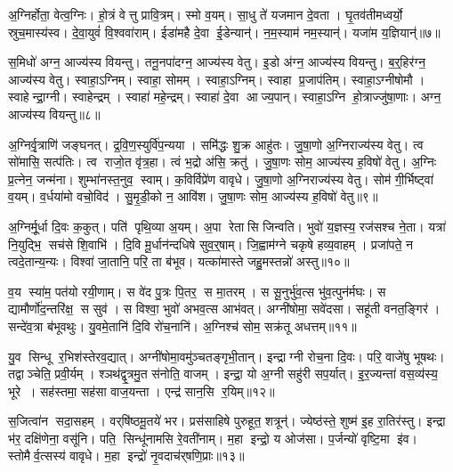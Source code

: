 अ॒ग्निर्\mbox{}होता॒ वेत्व॒ग्निः। हो॒त्रं वेत्तु प्रावि॒त्रम्। स्मो व॒यम्। सा॒धु ते॑ यजमान दे॒वता। घृ॒तव॑तीमध्वर्यो॒ स्रुच॒मास्य॑स्व। दे॒वा॒युवं॑ वि॒श्ववा॑राम्। ईडा॑महै दे॒वा ई॒डेन्यान्॑। न॒म॒स्याम॑ नम॒स्यान्॑। यजा॑म य॒ज्ञियान्॑॥७॥\anuvakamend[अ॒ग्निर्‌होता॒ नव॑]

स॒मिधो॑ अग्न॒ आज्य॑स्य वियन्तु। तनू॒नपा॑दग्न॒ आज्य॑स्य वेतु। इ॒डो अ॑ग्न॒ आज्य॑स्य वियन्तु। ब॒र्॒हिर॑ग्न॒ आज्य॑स्य वेतु। स्वाहा॒ऽग्निम्। स्वाहा॒ सोमम्। स्वाहा॒ऽग्निम्। स्वाहा प्र॒जाप॑तिम्। स्वाहा॒ऽग्नीषोमौ। स्वाहेन्द्रा॒ग्नी। स्वाहेन्द्रम्। स्वाहा॑ महे॒न्द्रम्। स्वाहा॑ दे॒वा आज्य॒पान्। स्वाहा॒ऽग्नि हो॒त्राज्जु॑षा॒णाः। अग्न॒ आज्य॑स्य वियन्तु॥८॥\anuvakamend[इ॒न्द्रा॒ग्नी पञ्च॑ च]

अ॒ग्निर्वृ॒त्राणि॑ जङ्घनत्। द्र॒वि॒ण॒स्युर्वि॑प॒न्यया। समि॑द्धः शु॒क्र आहु॑तः। जु॒षा॒णो अ॒ग्निराज्य॑स्य वेतु। त्व सो॑मासि॒ सत्प॑तिः। त्व राजो॒त वृ॑त्र॒हा। त्वं भ॒द्रो अ॑सि॒ क्रतु॑। जु॒षा॒णः सोम॒ आज्य॑स्य ह॒विषो॑ वेतु। अ॒ग्निः प्र॒त्नेन॒ जन्म॑ना। शुम्भा॑नस्त॒नुव॒ स्वाम्। क॒विर्विप्रे॑ण वावृधे। जु॒षा॒णो अ॒ग्निराज्य॑स्य वेतु। सोम॑ गी॒र्भिष्ट्वा॑ व॒यम्। व॒र्धया॑मो वचो॒विद॑। सु॒मृ॒डी॒को न॒ आवि॑श। जु॒षा॒णः सोम॒ आज्य॑स्य ह॒विषो॑ वेतु॥९॥\anuvakamend[स्वा षट् च॑]

अ॒ग्निर्मू॒र्धा दि॒वः क॒कुत्। पति॑ पृथि॒व्या अ॒यम्। अ॒पा रेतासि जिन्वति। भुवो॑ य॒ज्ञस्य॒ रज॑सश्च ने॒ता। यत्रा॑ नि॒युद्भि॒ सच॑से शि॒वाभि॑। दि॒वि मू॒र्धान॑न्दधिषे सुव॒र्॒षाम्। जि॒ह्वाम॑ग्ने चकृषे हव्य॒वाहम्। प्रजा॑पते॒ न त्वदे॒तान्य॒न्यः। विश्वा॑ जा॒तानि॒ परि॒ ता ब॑भूव। यत्का॑मास्ते जहु॒मस्तन्नो॑ अस्तु॥१०॥

व॒य स्या॑म॒ पत॑यो रयी॒णाम्। स वे॑द पु॒त्रः पि॒तर॒ स मा॒तरम्। स सू॒नुर्भु॑व॒त्स भु॑व॒त्पुन॑र्मघः। स द्यामौर्णो॑द॒न्तरि॑क्ष॒ स सुव॑। स विश्वा॒ भुवो॑ अभव॒त्स आभ॑वत्। अग्नी॑षोमा॒ सवे॑दसा। सहू॑ती वनत॒ङ्गिर॑। सन्दे॑व॒त्रा ब॑भूवथुः। यु॒वमे॒तानि॑ दि॒वि रो॑च॒नानि॑। अ॒ग्निश्च॑ सोम॒ सक्र॑तू अधत्तम्॥११॥

यु॒व सिन्धू र॒भिश॑स्तेरव॒द्यात्। अग्नी॑षोमा॒वमु॑ञ्चतङ्गृभी॒तान्। इन्द्राग्नी रोच॒ना दि॒वः। परि॒ वाजे॑षु भूषथः। तद्वाञ्चेति॒ प्रवी॒र्यम्। श्ञथ॑द्वृ॒त्रमु॒त स॑नोति॒ वाजम्। इन्द्रा॒ यो अ॒ग्नी सहु॑री सप॒र्यात्। इ॒र॒ज्यन्ता॑ वस॒व्य॑स्य॒ भूरे। सह॑स्तमा॒ सह॑सा वाज॒यन्ता। एन्द्र॑ सान॒सि र॒यिम्॥१२॥

स॒जित्वा॑न सदा॒सहम्। वर्‌षि॑ष्ठमू॒तये॑ भर। प्रस॑साहिषे पुरुहूत॒ शत्रून्॑। ज्येष्ठ॑स्ते॒ शुष्म॑ इ॒ह रा॒तिर॑स्तु। इन्द्रा भ॑र॒ दक्षि॑णेना॒ वसू॑नि। पति॒ सिन्धू॑नामसि रे॒वती॑नाम्। म॒हा इन्द्रो॒ य ओज॑सा। प॒र्जन्यो॑ वृष्टि॒मा इ॑व। स्तोमैर्व॒त्सस्य॑ वावृधे। म॒हा इन्द्रो॑ नृ॒वदाच॑र्‌षणि॒प्राः॥१३॥

